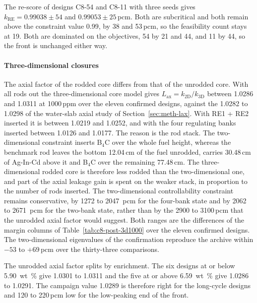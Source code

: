 The re-score of designs C8-54 and C8-11 with three seeds gives
$k_\mathrm{RE} = 0.99038 \pm 54$ and $0.99053 \pm 25$\,pcm.
Both are subcritical and both remain above the constraint value 0.99, by
38 and 53\,pcm, so the feasibility count stays at 19. Both are dominated
on the objectives, 54 by 21 and 44, and 11 by 44, so the front is
unchanged either way.

\paragraph{Three-dimensional closures}
\label{sec:res-c8-3d}

The axial factor of the rodded core differs from that of the unrodded
core. With all rods out the three-dimensional core model gives
$L_\mathrm{ax} = k_\mathrm{2D} / k_\mathrm{3D}$ between 1.0286 and
1.0311 at 1000\,ppm over the eleven confirmed designs, against the 1.0282
to 1.0298 of the water-slab axial study of Section~\ref{sec:meth-lax}.
With RE1 + RE2 inserted it is between 1.0219 and 1.0252, and with the
four regulating banks inserted between 1.0126 and 1.0177. The reason is
the rod stack.
The two-dimensional constraint inserts B$_4$C over the whole fuel height,
whereas the benchmark rod leaves the bottom 12.04\,cm of the fuel
unrodded, carries 30.48\,cm of Ag-In-Cd above it and B$_4$C over the
remaining 77.48\,cm. The three-dimensional rodded core is therefore
less rodded than the two-dimensional one, and part of the axial leakage
gain is spent on the weaker stack, in proportion to the number of rods
inserted. The two-dimensional controllability constraint remains conservative, by
\num{1272} to \SI{2047}{pcm} for the four-bank state and by \num{2062}
to \SI{2671}{pcm} for the two-bank state, rather than by the 2900 to
3100\,pcm that the unrodded axial factor would suggest. Both ranges are
the differences of the margin columns of
Table~\ref{tab:c8-post-3d1000} over the eleven confirmed designs. The
two-dimensional eigenvalues of the confirmation reproduce the archive
within $-53$ to $+69$\,pcm over the thirty-three comparisons.

The unrodded axial factor splits by enrichment. The six designs at or
below \SI{5.90}{wt\%} give 1.0301 to 1.0311 and the five at or above
\SI{6.59}{wt\%} give 1.0286 to 1.0291. The campaign value 1.0289 is
therefore right for the long-cycle designs and 120 to 220\,pcm low for
the low-peaking end of the front.

